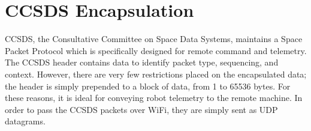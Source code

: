 \documentclass[12pt]{article}
\begin{document}
\section{CCSDS Encapsulation}
\par CCSDS, the Consultative Committee on Space Data Systems, maintains a Space Packet Protocol which is specifically designed for remote command and telemetry. The CCSDS header contains data to identify packet type, sequencing, and context. However, there are very few restrictions placed on the encapsulated data; the header is simply prepended to a block of data, from 1 to 65536 bytes. For these reasons, it is ideal for conveying robot telemetry to the remote machine. In order to pass the CCSDS packets over WiFi, they are simply sent as UDP datagrams. 



\newpage
\appendix
\end{document}
